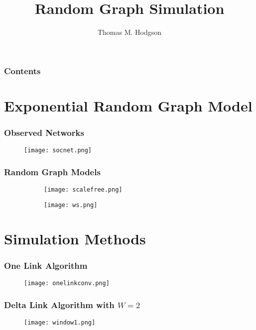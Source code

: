 \documentclass[11pt]{beamer}
\begin{document}
    \author{Thomas M. Hodgson}
    \title{Random Graph Simulation}
    \begin{frame}[plain]
    \maketitle
\end{frame}

\begin{frame}
\frametitle{Contents}
\tableofcontents
\end{frame}
\section[ERGM]{Exponential Random Graph Model}
\begin{frame}
\frametitle{Observed Networks}
\begin{figure}
\centering
\texttt{[image: socnet.png]}
\end{figure}
\end{frame}

\begin{frame}
\frametitle{Random Graph Models}
\begin{figure}
    \begin{subfigure}{0.49\linewidth}
    \centering
    \texttt{[image: scalefree.png]}
    \end{subfigure} 
    \begin{subfigure}{0.49\linewidth}
    \centering
    \texttt{[image: ws.png]}
\end{subfigure} 
\end{figure}
\end{frame}


\section[Simulation Methods]{Simulation Methods}
\begin{frame}
\frametitle{One Link Algorithm}
\begin{figure}
    \centering
    \texttt{[image: onelinkconv.png]}
\end{figure}
\end{frame}

\begin{frame}
\frametitle{Delta Link Algorithm with \(W=2\)}
\begin{figure}
    \centering
    \texttt{[image: window1.png]}
\end{figure}
\end{frame}
\end{document}
